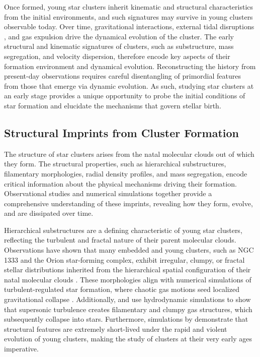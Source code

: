 \documentclass[12pt]{ucsddissertation}
\begin{document}
\begin{CJK*}{UTF8}{gbsn}
Once formed, young star clusters inherit kinematic and structural characteristics from the initial environments, and such signatures may survive in young clusters observable today. Over time, gravitational interactions, external tidal disruptions \citep[e.g.,][]{Baumgardt-2003, Lamers-2005}, and gas expulsion drive the dynamical evolution of the cluster. The early structural and kinematic signatures of clusters, such as substructure, mass segregation, and velocity dispersion, therefore encode key aspects of their formation environment and dynamical evolution. Reconstructing the history from present-day observations requires careful disentangling of primordial features from those that emerge via dynamic evolution. As such, studying star clusters at an early stage provides a unique opportunity to probe the initial conditions of star formation and elucidate the mechanisms that govern stellar birth.

%
\subsection*{Structural Imprints from Cluster Formation}

The structure of star clusters arises from the natal molecular clouds out of which they form. The structural properties, such as hierarchical substructures, filamentary morphologies, radial density profiles, and mass segregation, encode critical information about the physical mechanisms driving their formation. Observational studies and numerical simulations together provide a comprehensive understanding of these imprints, revealing how they form, evolve, and are dissipated over time.

Hierarchical substructures are a defining characteristic of young star clusters, reflecting the turbulent and fractal nature of their parent molecular clouds. Observations have shown that many embedded and young clusters, such as NGC 1333 and the Orion star-forming complex, exhibit irregular, clumpy, or fractal stellar distributions inherited from the hierarchical spatial configuration of their natal molecular clouds \citep[e.g.,][]{Cartwrite-2004, Kuhn-2014, Longmore-2014, DaRio-2016, Hacar-2017, Kounkel-2018, Swiggum-2021}. These morphologies align with numerical simulations of turbulent-regulated star formation, where chaotic gas motions seed localized gravitational collapse \citep[e.g.,][]{Bonnell-2003, Grudic-2018}. Additionally, \citet{Klessen-2000} and \citet{Federrath-2012} use hydrodynamic simulations to show that supersonic turbulence creates filamentary and clumpy gas structures, which subsequently collapse into stars. Furthermore, simulations by \citet{Allison-2009} demonstrate that structural features are extremely short-lived under the rapid and violent evolution of young clusters, making the study of clusters at their very early ages imperative.


\end{CJK*}
\end{document}
